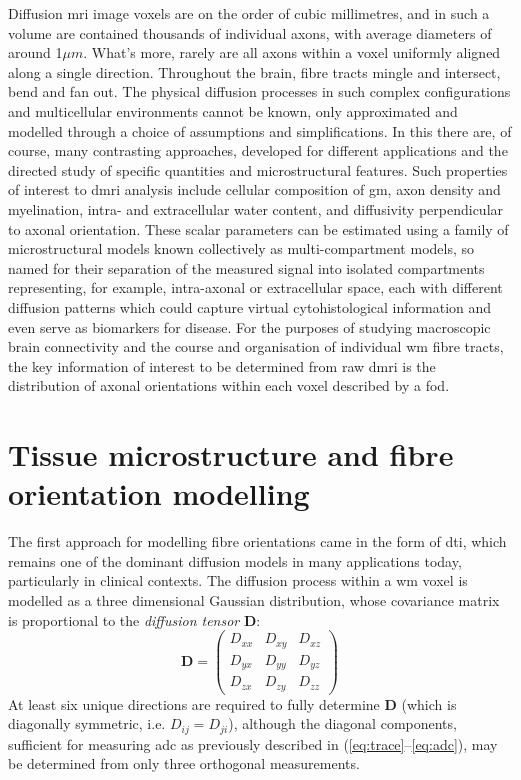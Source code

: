 Diffusion \gls{mri} image \glspl{voxel} are on the order of cubic millimetres, and in such a volume are contained thousands of individual axons, with average diameters of around 1$\mu m$\autocite{Liewald2014,Lampinen2019}.
What's more, rarely are all axons within a voxel uniformly aligned along a single direction.
Throughout the brain, fibre tracts mingle and intersect, bend and fan out\autocite{Jeurissen2013,Alexander2019}.
The physical diffusion processes in such complex configurations and multicellular environments cannot be known, only approximated and modelled through a choice of assumptions and simplifications.
In this there are, of course, many contrasting approaches, developed for different applications and the directed study of specific quantities and microstructural features.
Such properties of interest to \gls{dmri} analysis include cellular composition of \gls{gm}, axon density and myelination, intra- and extracellular water content, and diffusivity perpendicular to axonal orientation.
These scalar parameters can be estimated using a family of microstructural models known collectively as multi-compartment models, so named for their separation of the measured signal into isolated compartments representing, for example, intra-axonal or extracellular space, each with different diffusion patterns\autocite{Panagiotaki2012,Alexander2019} which could capture virtual cytohistological information and even serve as biomarkers for disease\autocite{Alexander2008}.
For the purposes of studying macroscopic brain connectivity and the course and organisation of individual \gls{wm} fibre tracts, the key information of interest to be determined from raw \gls{dmri} is the distribution of axonal orientations within each voxel described by a \gls{fod}.

\section{Tissue microstructure and fibre orientation modelling}


The first approach for modelling fibre orientations came in the form of \gls{dti}, which remains one of the dominant diffusion models in many applications today, particularly in clinical contexts.
The diffusion process within a \gls{wm} voxel is modelled as a three dimensional Gaussian distribution, whose covariance matrix is proportional to the \textit{diffusion tensor}\autocite{Basser1994,ODonnell2011} $\mathbf{D}$:
\begin{equation}
  \mathbf{D} = \begin{pmatrix}
                D_{xx} & D_{xy} & D_{xz}\\
                D_{yx} & D_{yy} & D_{yz} \\
                D_{zx} & D_{zy} & D_{zz}
                \end{pmatrix} \label{eq:dt}
\end{equation}
At least six unique directions are required to fully determine $\mathbf{D}$ (which is diagonally symmetric, i.e. $D_{ij} = D_{ji}$), although the diagonal components, sufficient for measuring \gls{adc} as previously described in (\ref{eq:trace}--\ref{eq:adc}), may be determined from only three orthogonal measurements.

